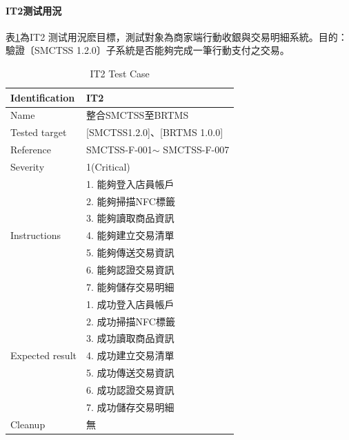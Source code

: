 			\paragraph{IT2测试用況}
				表\ref{IT2TestCase}為IT2 测试用況麽目標，測試對象為商家端行動收銀與交易明細系統。目的：驗證〔SMCTSS 1.2.0〕子系統是否能夠完成一筆行動支付之交易。

					\begin{table}[htbp]
					\caption{IT2 Test Case} %
					\centering %
					\label{IT2TestCase} %
					\begin{tabular}{|l|l|}
					\hline
					Identification & IT2 \\ \hline
					Name & 整合SMCTSS至BRTMS \\ \hline
					Tested target & {[}SMCTSS1.2.0{]}、{[}BRTMS 1.0.0{]} \\ \hline
					Reference & SMCTSS-F-001$\sim$ SMCTSS-F-007 \\ \hline
					Severity & 1(Critical) \\ \hline
					\multirow{7}{*}{Instructions} & 1.     能夠登入店員帳戶 \\ \cline{2-2} 
					 & 2.     能夠掃描NFC標籤 \\ \cline{2-2} 
					 & 3.     能夠讀取商品資訊 \\ \cline{2-2} 
					 & 4.     能夠建立交易清單 \\ \cline{2-2} 
					 & 5.     能夠傳送交易資訊 \\ \cline{2-2} 
					 & 6.     能夠認證交易資訊 \\ \cline{2-2} 
					 & 7.     能夠儲存交易明細 \\ \hline
					\multirow{7}{*}{Expected result} & 1.     成功登入店員帳戶 \\ \cline{2-2} 
					 & 2.     成功掃描NFC標籤 \\ \cline{2-2} 
					 & 3.     成功讀取商品資訊 \\ \cline{2-2} 
					 & 4.     成功建立交易清單 \\ \cline{2-2} 
					 & 5.     成功傳送交易資訊 \\ \cline{2-2} 
					 & 6.     成功認證交易資訊 \\ \cline{2-2} 
					 & 7.     成功儲存交易明細 \\ \hline
					Cleanup & 無 \\ \hline
					\end{tabular}
					\end{table}

